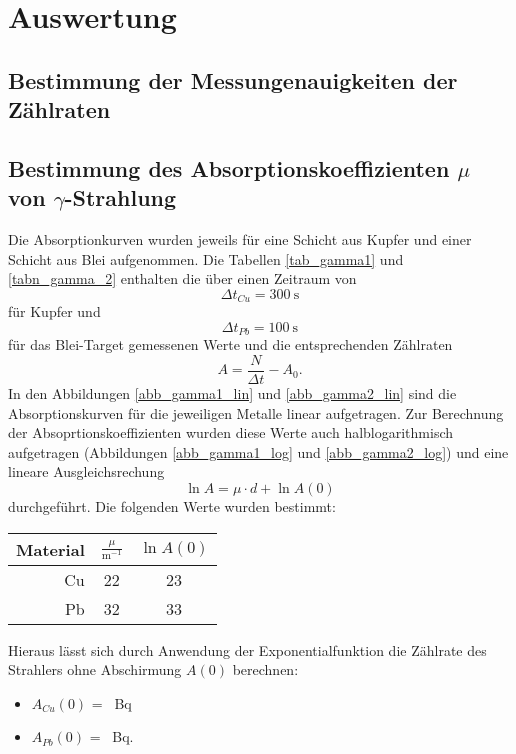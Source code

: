 \documentclass[11pt,ngerman,a4paper]{article}
\begin{document}
\section{Auswertung}
\subsection{Bestimmung der Messungenauigkeiten der Zählraten}
\subsection{Bestimmung des Absorptionskoeffizienten $\mu$ von $\gamma$-Strahlung}
Die Absorptionkurven wurden jeweils für eine Schicht aus Kupfer und einer Schicht aus Blei aufgenommen. Die Tabellen \ref{tab_gamma1}  und \ref{tabn_gamma_2} enthalten die über einen Zeitraum von 
\[
\Delta t_{Cu} = \SI{300}{\second}
\]
für Kupfer und
\[
\Delta t_{Pb} = \SI{100}{\second}
\]
für das Blei-Target gemessenen Werte und die entsprechenden Zählraten
\[
A = \frac{N}{\Delta t} - A_0.
\]
In den Abbildungen \ref{abb_gamma1_lin} und \ref{abb_gamma2_lin} sind die Absorptionskurven für die jeweiligen Metalle linear aufgetragen. Zur Berechnung der Absoprtionskoeffizienten wurden diese Werte auch halblogarithmisch aufgetragen (Abbildungen \ref{abb_gamma1_log} und \ref{abb_gamma2_log}) und eine lineare Ausgleichsrechung 
\[
\ln{A} = \mu \cdot d + \ln{A(0)}
\]
durchgeführt. Die folgenden Werte wurden bestimmt:
\begin{table}[h]
\centering
\begin{tabular}{rcc}

\toprule
	Material & $\frac{\mu}{\si{\meter^{-1}}}$ & $\ln{A(0)}$\\
 \midrule
	Cu & 22 & 23\\
	Pb & 32 & 33\\
\bottomrule
\end{tabular}
\end{table}

\noindent
Hieraus lässt sich durch Anwendung der Exponentialfunktion die Zählrate des Strahlers ohne Abschirmung $A(0)$ berechnen:
\begin{itemize}
\item $A_{Cu}(0)$ = \SI{}{\becquerel}
\item $A_{Pb}(0)$ = \SI{}{\becquerel}.

\end{itemize}
\end{document}
